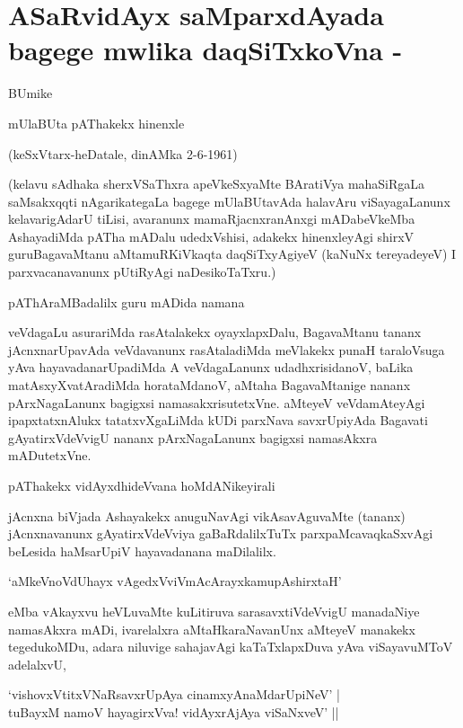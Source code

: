 \chapter{ASaRvidAyx saMparxdAyada bagege mwlika daqSiTxkoVna - }

\begin{center}
BUmike

mUlaBUta pAThakekx hinenxle

(keSxVtarx-heDatale, dinAMka 2-6-1961)
\end{center}

(kelavu sAdhaka sherxVSaThxra apeVkeSxyaMte BAratiVya mahaSiRgaLa saMsakxqqti nAgarikategaLa bagege mUlaBUtavAda halavAru viSayagaLanunx kelavarigAdarU tiLisi, avaranunx mamaRjacnxranAnxgi mADabeVkeMba AshayadiMda pATha mADalu udedxVshisi, adakekx hinenxleyAgi shirxV guruBagavaMtanu aMtamuRKiVkaqta daqSiTxyAgiyeV (kaNuNx tereyadeyeV) I parxvacanavanunx pUtiRyAgi naDesikoTaTxru.)

pAThAraMBadalilx guru mADida namana

veVdagaLu asurariMda rasAtalakekx oyayxlapxDalu, BagavaMtanu tananx jAcnxnarUpavAda veVdavanunx rasAtaladiMda meVlakekx punaH taraloVsuga yAva hayavadanarUpadiMda A veVdagaLanunx udadhxrisidanoV, baLika matAsxyXvatAradiMda horataMdanoV, aMtaha BagavaMtanige nananx pArxNagaLanunx bagigxsi namasakxrisutetxVne. aMteyeV veVdamAteyAgi ipapxtatxnAlukx tatatxvXgaLiMda kUDi parxNava savxrUpiyAda Bagavati gAyatirxVdeVvigU nananx pArxNagaLanunx bagigxsi namasAkxra mADutetxVne.

pAThakekx vidAyxdhideVvana hoMdANikeyirali

jAcnxna biVjada Ashayakekx anuguNavAgi vikAsavAguvaMte (tananx) jAcnxnavanunx gAyatirxVdeVviya gaBaRdalilxTuTx parxpaMcavaqkaSxvAgi beLesida haMsarUpiV hayavadanana maDilalilx.

\begin{shloka}
`aMkeVnoVdUhayx vAgedxVviVmAcArayxkamupAshirxtaH'
\end{shloka} 

eMba vAkayxvu heVLuvaMte kuLitiruva sarasavxtiVdeVvigU manadaNiye namasAkxra mADi, ivarelalxra aMtaHkaraNavanUnx aMteyeV manakekx tegedukoMDu, adara niluvige sahajavAgi kaTaTxlapxDuva yAva viSayavuMToV adelalxvU, 

\begin{shloka}
`vishovxVtitxVNaRsavxrUpAya cinamxyAnaMdarUpiNeV' |\\
tuBayxM namoV hayagirxVva! vidAyxrAjAya viSaNxveV' ||
\end{shloka}

